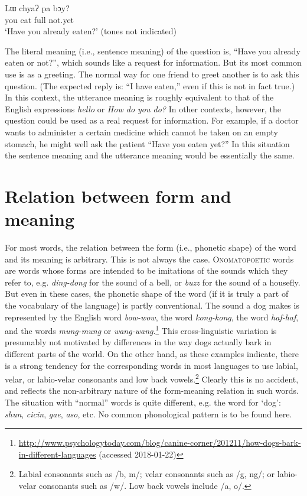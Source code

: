 \ea \label{ex:2}
\ea  \gll Lɯ  chyaʔ  pa  bɔy?\\
you  eat  full  not.yet\\
\glt ‘Have you already eaten?’  (tones not indicated)
\z \z


The literal meaning (i.e., sentence meaning) of the question is, “Have you already eaten or not?”, which sounds like a request for information. But its most common use is as a greeting. The normal way for one friend to greet another is to ask this question. (The expected reply is: “I have eaten,” even if this is not in fact true.) In this context, the utterance meaning is roughly equivalent to that of the English expressions \textit{hello} or \textit{How do you do?} In other contexts, however, the question could be used as a real request for information. For example, if a doctor wants to administer a certain medicine which cannot be taken on an empty stomach, he might well ask the patient “Have you eaten yet?” In this situation the sentence meaning and the utterance meaning would be essentially the same.


\section{Relation between form and meaning}\label{sec:1.3}

For most words, the relation between the form (i.e., phonetic shape) of the word and its meaning is arbitrary. This is not always the case. \textsc{Onomatopoetic} words are words whose forms are intended to be imitations of the sounds which they refer to, e.g. \textit{ding-dong} for the sound of a bell, or \textit{buzz} for the sound of a housefly. But even in these cases, the phonetic shape of the word (if it is truly a part of the vocabulary of the language) is partly conventional. The sound a dog makes is represented by the English word \textit{bow-wow}, the  word \textit{kong-kong}, the  word \textit{haf-haf}, and the  words \textit{mung-mung} or \textit{wang-wang}.\footnote{\url{http://www.psychologytoday.com/blog/canine-corner/201211/how-dogs-bark-in-different-languages} (accessed 2018-01-22)} This cross-linguistic variation is presumably not motivated by differences in the way dogs actually bark in different parts of the world. On the other hand, as these examples indicate, there is a strong tendency for the corresponding words in most languages to use labial, velar, or labio-velar consonants and low back vowels.\footnote{Labial consonants such as /b, m/; velar consonants such as /g, ng/; or labio-velar consonants such as /w/. Low back vowels include /a, o/.} Clearly this is no accident, and reflects the non-arbitrary nature of the form-meaning relation in such words. The situation with “normal” words is quite different, e.g. the word for ‘dog’:  \textit{shun},  \textit{cicin},  \textit{gae},  \textit{aso}, etc. No common phonological pattern is to be found here.



